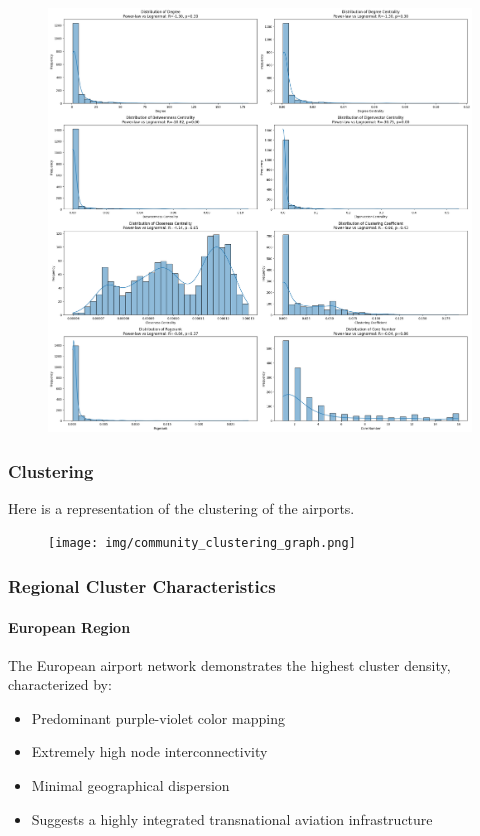 \documentclass[12pt]{article}
\begin{document}
    \begin{figure}[H]
        \centering
        \includegraphics[width=1\linewidth]{img/powerlaw.png}
    \end{figure}

        \subsubsection{Clustering}
        Here is a representation of the clustering of the airports.

    \begin{figure}[H]
        \centering
        \texttt{[image: img/community\_clustering\_graph.png]}
    \end{figure}

    \subsubsection{Regional Cluster Characteristics}
        \paragraph{European Region} 
        
            The European airport network demonstrates the highest cluster density, characterized by:
            \begin{itemize}
            \item Predominant purple-violet color mapping
            \item Extremely high node interconnectivity
            \item Minimal geographical dispersion
            \item Suggests a highly integrated transnational aviation infrastructure
            \end{itemize}
\end{document}

